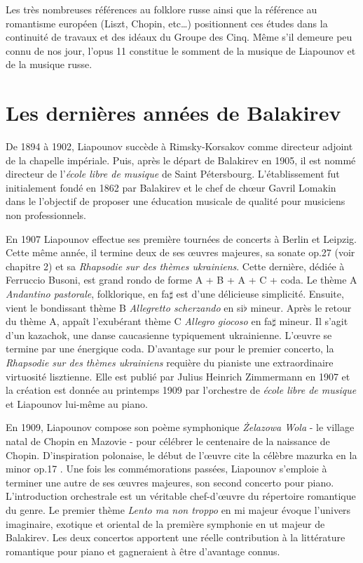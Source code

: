 Les très nombreuses références au folklore russe ainsi que la référence au romantisme européen (Liszt, Chopin, etc\dots) positionnent ces études dans la continuité de travaux et des idéaux du Groupe des Cinq. Même s'il demeure peu connu de nos jour, l'opus 11 constitue le somment de la musique de Liapounov et de la musique russe.

\newpage

\section{Les dernières années de Balakirev}

De 1894 à 1902, Liapounov succède à Rimsky-Korsakov comme directeur adjoint de la chapelle impériale. Puis, après le départ de Balakirev en 1905, il est nommé directeur de l'\emph{école libre de musique} de Saint Pétersbourg. L'établissement fut initialement fondé en 1862 par Balakirev et le chef de chœur Gavril Lomakin dans le l'objectif de proposer une éducation musicale de qualité pour musiciens non professionnels.

En 1907 Liapounov effectue ses première tournées de concerts à Berlin et Leipzig. Cette même année, il termine deux de ses œuvres majeures, sa sonate op.27 (voir chapitre 2) et sa \emph{Rhapsodie sur des thèmes ukrainiens}. Cette dernière, dédiée à Ferruccio Busoni, est grand rondo de forme A + B + A + C + coda. Le thème A \emph{Andantino pastorale}, folklorique, en fa$\sharp$ est d'une délicieuse simplicité. Ensuite, vient le bondissant thème B \emph{Allegretto scherzando} en si$\flat$ mineur. Après le retour du thème A, appaît l’exubérant thème C \emph{Allegro giocoso} en fa$\sharp$ mineur. Il s'agit d'un kazachok, une danse caucasienne typiquement ukrainienne. L'œuvre se termine par une énergique coda. D'avantage sur pour le premier concerto, la \emph{Rhapsodie sur des thèmes ukrainiens} requière du pianiste une extraordinaire virtuosité lisztienne. Elle est publié par Julius Heinrich Zimmermann en 1907 et la création est donnée au printemps 1909 par l'orchestre de \emph{école libre de musique} et Liapounov lui-même au piano.

En 1909, Liapounov compose son poème symphonique \emph{Żelazowa Wola} - le village natal de Chopin en Mazovie - pour célébrer le centenaire de la naissance de Chopin. D'inspiration polonaise, le début de l'œuvre cite la célèbre mazurka en la minor op.17 . Une fois les commémorations passées, Liapounov s'emploie à terminer une autre de ses œuvres majeures, son second concerto pour piano. L'introduction orchestrale est un véritable chef-d'œuvre du répertoire romantique du genre. Le premier thème \emph{Lento ma non troppo} en mi majeur évoque l'univers imaginaire, exotique et oriental de la première symphonie en ut majeur de Balakirev. Les deux concertos apportent une réelle contribution à la littérature romantique pour piano et gagneraient à être d'avantage connus.

